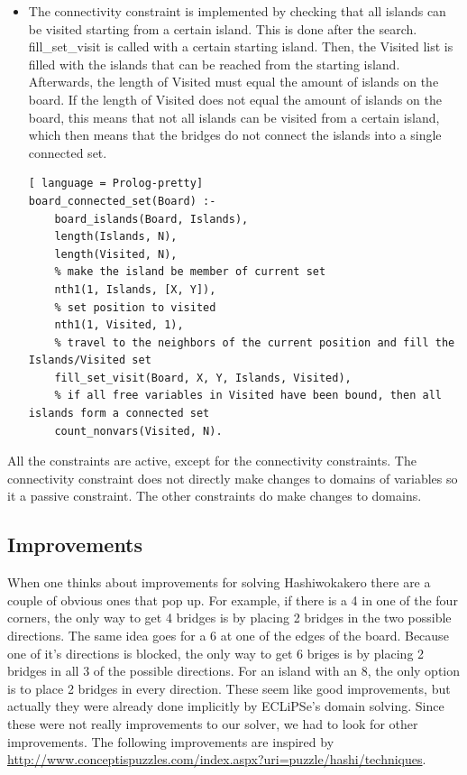 \documentclass{report}
\begin{document}
\begin{itemize}
    \item The connectivity constraint is implemented by checking that all islands can be visited starting from a certain island. This is done after the search. fill\_set\_visit is called with a certain starting island. Then, the Visited list is filled with the islands that can be reached from the starting island. Afterwards, the length of Visited must equal the amount of islands on the board. If the length of Visited does not equal the amount of islands on the board, this means that not all islands can be visited from a certain island, which then means that the bridges do not connect the islands into a single connected set.
\begin{lstlisting}[ language = Prolog-pretty]
board_connected_set(Board) :-
    board_islands(Board, Islands),
    length(Islands, N),
    length(Visited, N),
    % make the island be member of current set
    nth1(1, Islands, [X, Y]),
    % set position to visited
    nth1(1, Visited, 1),
    % travel to the neighbors of the current position and fill the Islands/Visited set
    fill_set_visit(Board, X, Y, Islands, Visited),
    % if all free variables in Visited have been bound, then all islands form a connected set
    count_nonvars(Visited, N).
\end{lstlisting}

\end{itemize}
All the constraints are active, except for the connectivity constraints. The connectivity constraint does not directly make changes to domains of variables so it a passive constraint. The other constraints do make changes to domains.
\subsection{Improvements}
When one thinks about improvements for solving Hashiwokakero there are a couple of obvious ones that pop up. For example, if there is a 4 in one of the four corners, the only way to get 4 bridges is by placing 2 bridges in the two possible directions. The same idea goes for a 6 at one of the edges of the board. Because one of it's directions is blocked, the only way to get 6 briges is by placing 2 bridges in all 3 of the possible directions. For an island with an 8, the only option is to place 2 bridges in every direction. These seem like good improvements, but actually they were already done implicitly by ECLiPSe's domain solving. Since these were not really improvements to our solver, we had to look for other improvements. The following improvements are inspired by \url{http://www.conceptispuzzles.com/index.aspx?uri=puzzle/hashi/techniques}.
\end{document}
